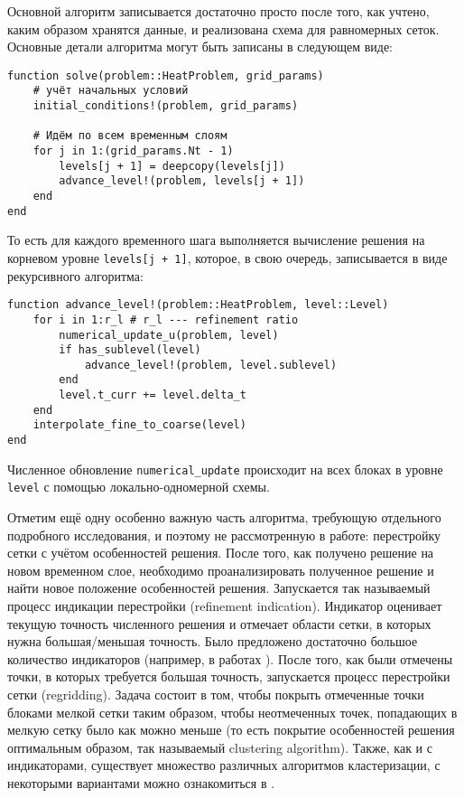 Основной алгоритм записывается достаточно просто после того, как учтено, каким образом хранятся данные, и реализована схема для равномерных сеток.
Основные детали алгоритма могут быть записаны в следующем виде:
\begin{verbatim}
function solve(problem::HeatProblem, grid_params)
    # учёт начальных условий
    initial_conditions!(problem, grid_params)

    # Идём по всем временным слоям
    for j in 1:(grid_params.Nt - 1)
        levels[j + 1] = deepcopy(levels[j])
        advance_level!(problem, levels[j + 1])
    end
end
\end{verbatim}
То есть для каждого временного шага выполняется вычисление решения на корневом уровне \texttt{levels[j + 1]}, которое, в свою очередь, записывается в виде рекурсивного алгоритма:
\begin{verbatim}
function advance_level!(problem::HeatProblem, level::Level)
    for i in 1:r_l # r_l --- refinement ratio
        numerical_update_u(problem, level)
        if has_sublevel(level)
            advance_level!(problem, level.sublevel)
        end
        level.t_curr += level.delta_t
    end
    interpolate_fine_to_coarse(level)
end
\end{verbatim}
Численное обновление \texttt{numerical\_update} происходит на всех блоках в уровне \texttt{level} с помощью локально-одномерной схемы.

Отметим ещё одну особенно важную часть алгоритма, требующую отдельного подробного исследования, и поэтому не рассмотренную в работе: перестройку сетки с учётом особенностей решения.
После того, как получено решение на новом временном слое, необходимо проанализировать полученное решение и найти новое положение особенностей решения.
Запускается так называемый процесс индикации перестройки (refinement indication).
Индикатор оценивает текущую точность численного решения и отмечает области сетки, в которых нужна большая/меньшая точность.
Было предложено достаточно большое количество индикаторов (например, в работах \cite{berger1989local, berger1982adaptive, lohner1987adaptive}).
После того, как были отмечены точки, в которых требуется большая точность, запускается процесс перестройки сетки (regridding).
Задача состоит в том, чтобы покрыть отмеченные точки блоками мелкой сетки таким образом, чтобы неотмеченных точек, попадающих в мелкую сетку было как можно меньше (то есть покрытие особенностей решения оптимальным образом, так называемый clustering algorithm).
Также, как и с индикаторами, существует множество различных алгоритмов кластеризации, с некоторыми вариантами можно ознакомиться в \cite{berger1989local, deiterding2011block}.